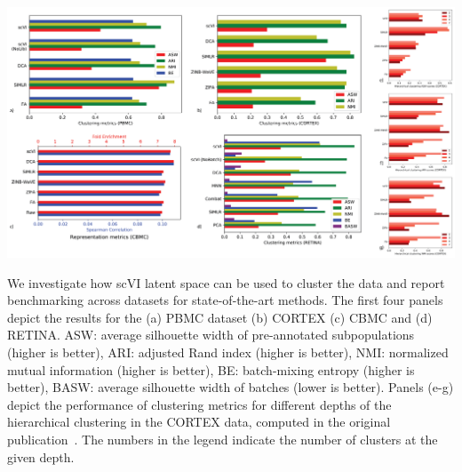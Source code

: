 \begin{suppfigure}
\centering
\includegraphics[width=\textwidth]{figures/clustering_supplement.png}
\caption[Clustering performance]{We investigate how scVI latent space can be used to cluster the data and report benchmarking across datasets for state-of-the-art methods. The first four panels depict the results for the (a) PBMC dataset (b) CORTEX (c) CBMC and (d) RETINA. ASW: average silhouette width of pre-annotated subpopulations (higher is better), ARI: adjusted Rand index (higher is better), NMI: normalized mutual information (higher is better), BE: batch-mixing entropy (higher is better), BASW: average silhouette width of batches (lower is better). Panels (e-g) depict the performance of clustering metrics for different depths of the hierarchical clustering in the CORTEX data, computed in the original publication~\cite{Zeisel1138}. The numbers in the legend indicate the number of clusters at the given depth.}
\label{scviclustering_supp}
\end{suppfigure}

